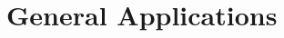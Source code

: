 \documentclass[../main]{subfiles}
\begin{document}
\chapter{General Applications} \label{chp:}
\end{document}
